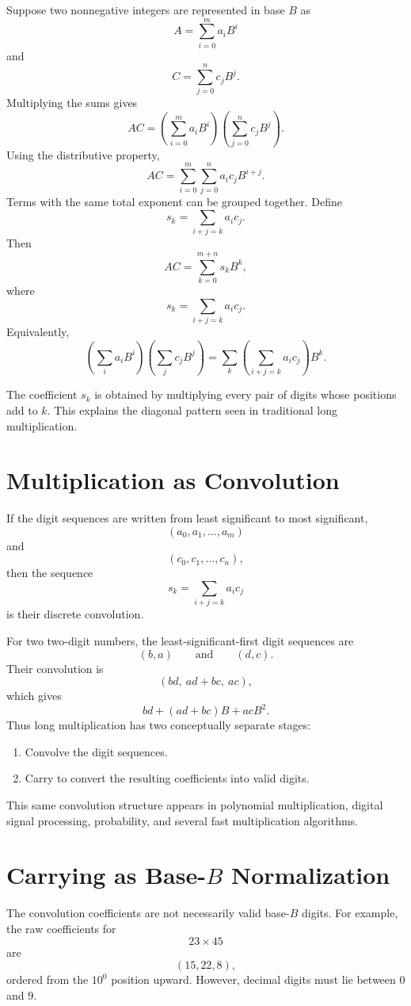 \documentclass[11pt]{article}
\begin{document}
Suppose two nonnegative integers are represented in base $B$ as
\[
A=\sum_{i=0}^{m}a_iB^i
\]
and
\[
C=\sum_{j=0}^{n}c_jB^j.
\]
Multiplying the sums gives
\[
AC=
\left(\sum_{i=0}^{m}a_iB^i\right)
\left(\sum_{j=0}^{n}c_jB^j\right).
\]
Using the distributive property,
\[
AC=\sum_{i=0}^{m}\sum_{j=0}^{n}a_ic_jB^{i+j}.
\]
Terms with the same total exponent can be grouped together. Define
\[
s_k=\sum_{i+j=k}a_ic_j.
\]
Then
\[
\boxed{AC=\sum_{k=0}^{m+n}s_kB^k},
\]
where
\[
\boxed{s_k=\sum_{i+j=k}a_ic_j}.
\]
Equivalently,
\[
\boxed{
\left(\sum_i a_iB^i\right)
\left(\sum_j c_jB^j\right)
=
\sum_k\left(\sum_{i+j=k}a_ic_j\right)B^k
}.
\]

The coefficient $s_k$ is obtained by multiplying every pair of digits whose positions add to $k$. This explains the diagonal pattern seen in traditional long multiplication.

\section{Multiplication as Convolution}

If the digit sequences are written from least significant to most significant,
\[
(a_0,a_1,\ldots,a_m)
\]
and
\[
(c_0,c_1,\ldots,c_n),
\]
then the sequence
\[
s_k=\sum_{i+j=k}a_ic_j
\]
is their discrete convolution.

For two two-digit numbers, the least-significant-first digit sequences are
\[
(b,a)
\qquad\text{and}\qquad
(d,c).
\]
Their convolution is
\[
(bd,\ ad+bc,\ ac),
\]
which gives
\[
bd+(ad+bc)B+acB^2.
\]
Thus long multiplication has two conceptually separate stages:
\begin{enumerate}[label=\arabic*.]
\item Convolve the digit sequences.
\item Carry to convert the resulting coefficients into valid digits.
\end{enumerate}

This same convolution structure appears in polynomial multiplication, digital signal processing, probability, and several fast multiplication algorithms.

\section{Carrying as Base-$B$ Normalization}

The convolution coefficients are not necessarily valid base-$B$ digits. For example, the raw coefficients for
\[
23\times45
\]
are
\[
(15,22,8),
\]
ordered from the $10^0$ position upward. However, decimal digits must lie between $0$ and $9$.
\end{document}
